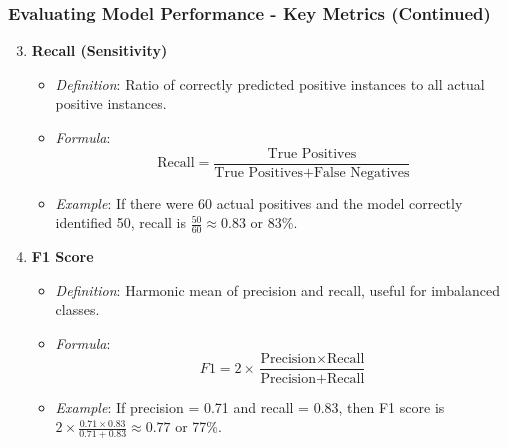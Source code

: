 \documentclass[aspectratio=169]{beamer}
\begin{document}
\begin{frame}[fragile]
    \frametitle{Evaluating Model Performance - Key Metrics (Continued)}
    \begin{enumerate}
        \setcounter{enumi}{2} %
        \item \textbf{Recall (Sensitivity)}
            \begin{itemize}
                \item \textit{Definition}: Ratio of correctly predicted positive instances to all actual positive instances.
                \item \textit{Formula}:
                \begin{equation}
                    \text{Recall} = \frac{\text{True Positives}}{\text{True Positives} + \text{False Negatives}}
                \end{equation}
                \item \textit{Example}: If there were 60 actual positives and the model correctly identified 50, recall is \( \frac{50}{60} \approx 0.83 \) or 83\%.
            \end{itemize}

        \item \textbf{F1 Score}
            \begin{itemize}
                \item \textit{Definition}: Harmonic mean of precision and recall, useful for imbalanced classes.
                \item \textit{Formula}:
                \begin{equation}
                    F1 = 2 \times \frac{\text{Precision} \times \text{Recall}}{\text{Precision} + \text{Recall}}
                \end{equation}
                \item \textit{Example}: If precision = 0.71 and recall = 0.83, then F1 score is \( 2 \times \frac{0.71 \times 0.83}{0.71 + 0.83} \approx 0.77 \) or 77\%.
            \end{itemize}
    \end{enumerate}
\end{frame}
\end{document}
